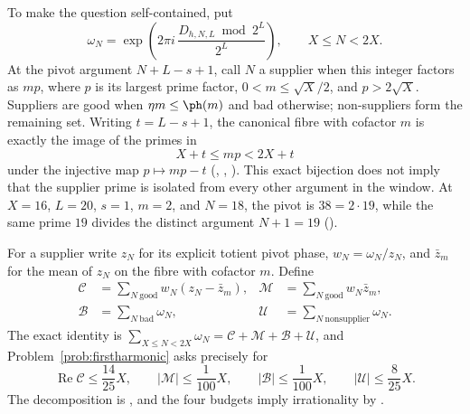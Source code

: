 To make the question self-contained, put
\[
 \omega_N=\exp\!\left(2\pi i\,
   \frac{D_{h,N,L}\bmod 2^L}{2^L}\right),\qquad X\le N<2X.
\]
At the pivot argument $N+L-s+1$, call $N$ a supplier when this integer factors
as $mp$, where $p$ is its largest prime factor,
$0<m\le\sqrt X/2$, and $p>2\sqrt X$.  Suppliers are good when
$\eta m\le\ph(m)$ and bad otherwise; non-suppliers form the remaining set.
Writing $t=L-s+1$, the canonical fibre with cofactor $m$ is exactly the image
of the primes in
\[
 X+t\le mp<2X+t
\]
under the injective map $p\mapsto mp-t$
(,
,
).
This exact bijection does not imply that the supplier prime is isolated from
every other argument in the window.  At $X=16$, $L=20$, $s=1$, $m=2$, and
$N=18$, the pivot is $38=2\cdot19$, while the same prime $19$ divides the
distinct argument $N+1=19$
().

For a supplier write $z_N$ for its explicit totient pivot phase,
$w_N=\omega_N/z_N$, and $\bar z_m$ for the mean of $z_N$ on the fibre with
cofactor $m$.  Define
\[
\begin{aligned}
 \mathcal C&=\sum_{N\ {\mathrm{good}}}w_N(z_N-\bar z_m),&
 \mathcal M&=\sum_{N\ {\mathrm{good}}}w_N\bar z_m,\\
 \mathcal B&=\sum_{N\ {\mathrm{bad}}}\omega_N,&
 \mathcal U&=\sum_{N\ {\mathrm{nonsupplier}}}\omega_N.
\end{aligned}
\]
The exact identity is
$\sum_{X\le N<2X}\omega_N=\mathcal C+\mathcal M+\mathcal B+\mathcal U$, and
Problem~\ref{prob:firstharmonic} asks precisely for
\[
 \operatorname{Re}\mathcal C\le\frac{14}{25}X,\qquad
 |\mathcal M|\le\frac1{100}X,\qquad
 |\mathcal B|\le\frac1{100}X,\qquad
 |\mathcal U|\le\frac8{25}X.
\]
The decomposition is
,
and the four budgets imply irrationality by
.

